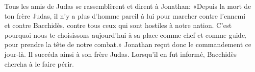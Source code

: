 Tous les amis de Judas se rassemblèrent et dirent à Jonathan:
	«Depuis la mort de ton frère Judas,
	il n’y a plus d’homme pareil à lui pour marcher contre l’ennemi et contre Bacchidès,
	contre tous ceux qui sont hostiles à notre nation.
C’est pourquoi nous te choisissons aujourd’hui à sa place comme chef et comme guide,
	pour prendre la tête de notre combat.»
Jonathan reçut donc le commandement ce jour-là.
	Il succéda ainsi à son frère Judas.
Lorsqu’il en fut informé, Bacchidès chercha à le faire périr.
